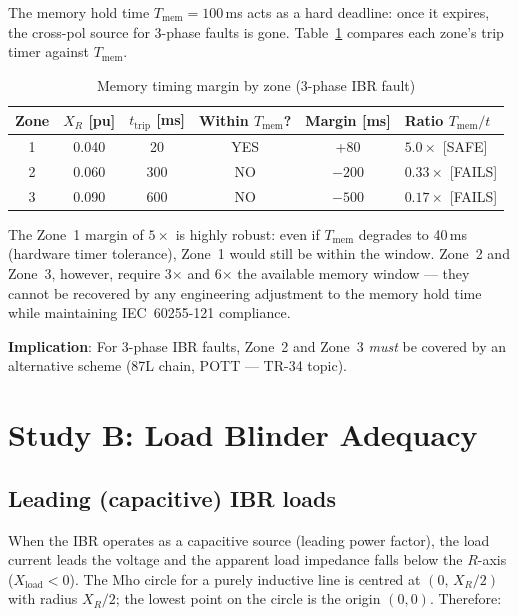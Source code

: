 \documentclass[11pt,a4paper]{article}
\begin{document}
The memory hold time $T_\mathrm{mem}=100$\,ms acts as a hard deadline: once it
expires, the cross-pol source for 3-phase faults is gone.  Table~\ref{tab:timing}
compares each zone's trip timer against $T_\mathrm{mem}$.

\begin{table}[h]
\centering
\caption{Memory timing margin by zone (3-phase IBR fault)}
\label{tab:timing}
\begin{tabular}{@{}cccccl@{}}
\toprule
Zone & $X_R$ [pu] & $t_\mathrm{trip}$ [ms] & Within $T_\mathrm{mem}$? &
  Margin [ms] & Ratio $T_\mathrm{mem}/t$ \\
\midrule
1 & 0.040 & \phantom{0}20 & \cellcolor{green!20}YES &  +80 & $5.0\times$ [SAFE]  \\
2 & 0.060 &            300 & \cellcolor{red!15}NO   & $-200$ & $0.33\times$ [FAILS]\\
3 & 0.090 &            600 & \cellcolor{red!15}NO   & $-500$ & $0.17\times$ [FAILS]\\
\bottomrule
\end{tabular}
\end{table}

The Zone~1 margin of $5\times$ is highly robust: even if $T_\mathrm{mem}$ degrades
to 40\,ms (hardware timer tolerance), Zone~1 would still be within the window.
Zone~2 and Zone~3, however, require 3$\times$ and 6$\times$ the available memory
window --- they cannot be recovered by any engineering adjustment to the memory
hold time while maintaining IEC~60255-121 compliance.

\textbf{Implication}: For 3-phase IBR faults, Zone~2 and Zone~3 \emph{must} be
covered by an alternative scheme (87L chain, POTT --- TR-34 topic).

\section{Study B: Load Blinder Adequacy}
\label{sec:blinder}

\subsection{Leading (capacitive) IBR loads}

When the IBR operates as a capacitive source (leading power factor), the load
current leads the voltage and the apparent load impedance falls below the
$R$-axis ($X_\mathrm{load}<0$).  The Mho circle for a purely inductive line is
centred at $(0,\,X_R/2)$ with radius $X_R/2$; the lowest point on the circle is
the origin $(0,0)$.  Therefore:
\end{document}
